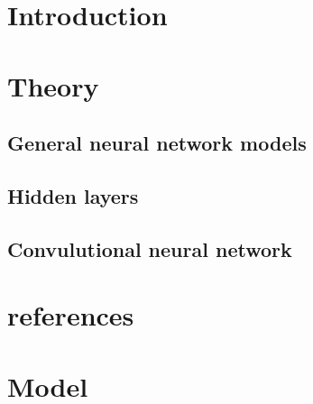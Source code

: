 \documentclass[a4paper]{article}
\begin{document}
\maketitle

\newpage
\tableofcontents
\newpage

\section{Introduction}


\section{Theory}
\subsection{General neural network models}


\subsection{Hidden layers}


\subsection{Convulutional neural network}











\section{references}




\section{Model}



{}

\end{document}
